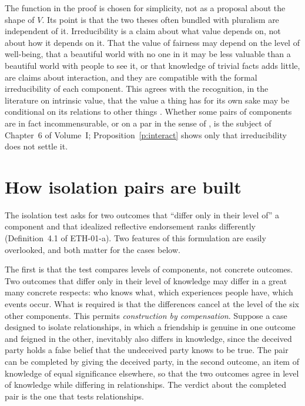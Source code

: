 \documentclass{situationist-preprint}
\begin{document}
The function in the proof is chosen for simplicity, not as a proposal about the shape of $V$. Its point is that the two theses often bundled with pluralism are independent of it. Irreducibility is a claim about what value depends on, not about how it depends on it. That the value of fairness may depend on the level of well-being, that a beautiful world with no one in it may be less valuable than a beautiful world with people to see it, or that knowledge of trivial facts adds little, are claims about interaction, and they are compatible with the formal irreducibility of each component. This agrees with the recognition, in the literature on intrinsic value, that the value a thing has for its own sake may be conditional on its relations to other things \citep{Korsgaard1983,Kagan1998,RabinowiczRonnow2000}. Whether some pairs of components are in fact incommensurable, or on a par in the sense of \citet{Chang2002}, is the subject of Chapter~6 of Volume~I; Proposition~\ref{p:interact} shows only that irreducibility does not settle it.

\section{How isolation pairs are built}\label{s:method}

The isolation test asks for two outcomes that \enquote{differ only in their level of} a component and that idealized reflective endorsement ranks differently (Definition~4.1 of ETH-01-a). Two features of this formulation are easily overlooked, and both matter for the cases below.

The first is that the test compares levels of components, not concrete outcomes. Two outcomes that differ only in their level of knowledge may differ in a great many concrete respects: who knows what, which experiences people have, which events occur. What is required is that the differences cancel at the level of the six other components. This permits \emph{construction by compensation}. Suppose a case designed to isolate relationships, in which a friendship is genuine in one outcome and feigned in the other, inevitably also differs in knowledge, since the deceived party holds a false belief that the undeceived party knows to be true. The pair can be completed by giving the deceived party, in the second outcome, an item of knowledge of equal significance elsewhere, so that the two outcomes agree in level of knowledge while differing in relationships. The verdict about the completed pair is the one that tests relationships.
\end{document}
